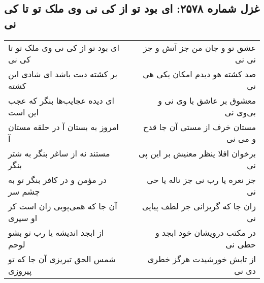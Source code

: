 \begin{center}
\section*{غزل شماره ۲۵۷۸: ای بود تو از کی نی وی ملک تو تا کی نی}
\label{sec:2578}
\begin{longtable}{l p{0.5cm} r}
ای بود تو از کی نی وی ملک تو تا کی نی
&&
عشق تو و جان من جز آتش و جز نی نی
\\
بر کشته دیت باشد ای شادی این کشته
&&
صد کشته هو دیدم امکان یکی هی نی
\\
ای دیده عجایب‌ها بنگر که عجب این است
&&
معشوق بر عاشق با وی نی و بی‌وی نی
\\
امروز به بستان آ در حلقه مستان آ
&&
مستان خرف از مستی آن جا قدح و می نی
\\
مستند نه از ساغر بنگر به شتر بنگر
&&
برخوان افلا ینظر معنیش بر این پی نی
\\
در مؤمن و در کافر بنگر تو به چشم سر
&&
جز نعره یا رب نی جز ناله یا حی نی
\\
آن جا که همی‌پویی زان است کز او سیری
&&
زان جا که گریزانی جز لطف پیاپی نی
\\
از ابجد اندیشه یا رب تو بشو لوحم
&&
در مکتب درویشان خود ابجد و حطی نی
\\
شمس الحق تبریزی آن جا که تو پیروزی
&&
از تابش خورشیدت هرگز خطری دی نی
\\
\end{longtable}
\end{center}
